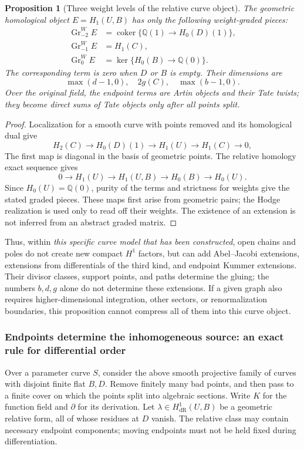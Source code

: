 \documentclass[11pt,a4paper,oneside]{article}
\theoremstyle{plain}
\newtheorem{proposition}[theorem]{Proposition}
\theoremstyle{definition}
\theoremstyle{remark}
\newcommand{\Q}{\mathbb Q}
\newcommand{\dR}{\mathrm{dR}}
\numberwithin{equation}{section}
\begin{document}
\begin{proposition}[Three weight levels of the relative curve object]\label{unified:prop:curve-boundary}
The geometric homological object $E=H_1(U,B)$ has only the following weight-graded pieces:
\[
 \begin{split}
 \operatorname{Gr}_{-2}^W E
   &=\operatorname{coker}\{\Q(1)\to H_0(D)(1)\},\\
 \operatorname{Gr}_{-1}^W E&=H_1(C),\\
 \operatorname{Gr}_{0}^W E
   &=\ker\{H_0(B)\to\Q(0)\}.
 \end{split}
\]
The corresponding term is zero when $D$ or $B$ is empty. Their dimensions are
\[
 \max(d-1,0),\quad 2g(C),\quad\max(b-1,0).
\]
Over the original field, the endpoint terms are Artin objects and their Tate twists; they become direct sums of Tate objects only after all points split.
\end{proposition}
\begin{proof}
Localization for a smooth curve with points removed and its homological dual give
\[
 H_2(C)\longrightarrow H_0(D)(1)\longrightarrow
 H_1(U)\longrightarrow H_1(C)\longrightarrow0,
\]
The first map is diagonal in the basis of geometric points.
The relative homology exact sequence gives
\[
 0\longrightarrow H_1(U)\longrightarrow H_1(U,B)
 \longrightarrow H_0(B)\longrightarrow H_0(U).
\]
Since $H_0(U)=\Q(0)$, purity of the terms and strictness for weights give the stated graded pieces.
These maps first arise from geometric pairs; the Hodge realization is used only to read off their weights.
The existence of an extension is not inferred from an abstract graded matrix.
\end{proof}
Thus, within \emph{this specific curve model that has been constructed},
open chains and poles do not create new compact $H^1$ factors, but can add
Abel--Jacobi extensions, extensions from differentials of the third kind, and endpoint Kummer extensions.
Their divisor classes, support points, and paths determine the gluing; the numbers $b,d,g$ alone do not determine these extensions.
If a given graph also requires higher-dimensional integration, other sectors, or renormalization boundaries,
this proposition cannot compress all of them into this curve object.

\subsubsection{Endpoints determine the inhomogeneous source: an exact rule for differential order}
Over a parameter curve $S$, consider the above smooth projective family of curves with disjoint finite flat $B,D$.
Remove finitely many bad points, and then pass to a finite cover on which the points split into algebraic sections.
Write $K$ for the function field and $\partial$ for its derivation.
Let $\lambda\in H^1_{\dR}(U,B)$ be a geometric relative form,
all of whose residues at $D$ vanish.
The relative class may contain necessary endpoint components; moving endpoints must not be held fixed during differentiation.
\end{document}
